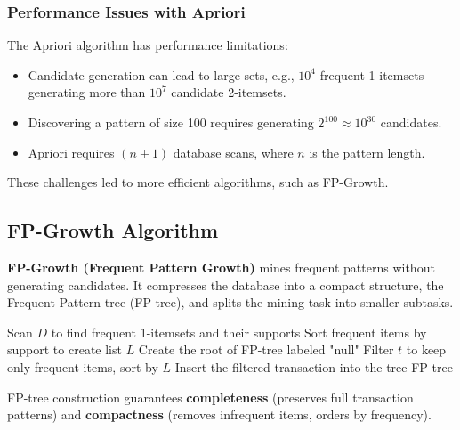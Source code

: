 \subsubsection{Performance Issues with Apriori}

The Apriori algorithm has performance limitations:
\begin{itemize}
    \item Candidate generation can lead to large sets, e.g., $10^4$ frequent 1-itemsets generating more than $10^7$ candidate 2-itemsets.
    \item Discovering a pattern of size 100 requires generating $2^{100} \approx 10^{30}$ candidates.
    \item Apriori requires $(n+1)$ database scans, where $n$ is the pattern length.
\end{itemize}
These challenges led to more efficient algorithms, such as FP-Growth.


\subsection{FP-Growth Algorithm}

\textbf{FP-Growth (Frequent Pattern Growth)} mines frequent patterns without generating candidates. It compresses the database into a compact structure, the Frequent-Pattern tree (FP-tree), and splits the mining task into smaller subtasks.

\begin{algorithm}
\caption{FP-tree Construction}
\begin{algorithmic}[1]
    \State Scan $D$ to find frequent 1-itemsets and their supports
    \State Sort frequent items by support to create list $L$
    \State Create the root of FP-tree labeled "null"
        \State Filter $t$ to keep only frequent items, sort by $L$
        \State Insert the filtered transaction into the tree
    \EndFor
    \State \Return FP-tree
\EndProcedure
\end{algorithmic}
\end{algorithm}

FP-tree construction guarantees \textbf{completeness} (preserves full transaction patterns) and \textbf{compactness} (removes infrequent items, orders by frequency).

